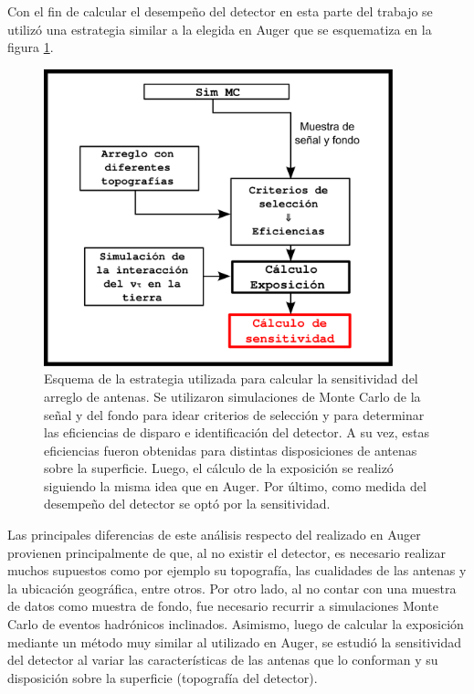 Con el fin de calcular el desempe\~no del detector en esta parte del trabajo se utiliz\'o una estrategia similar a la elegida en Auger que se esquematiza en la figura \ref{fig:analysisSchemaRadio}.
%
\begin{figure}[h!]
	\begin{center}
		\includegraphics[width=0.9\textwidth]{fig/motivacionRadio/analysisSchemaRadio}
		\caption{Esquema de la estrategia utilizada para calcular la sensitividad del arreglo de antenas. Se utilizaron simulaciones de Monte Carlo de la se\~nal y del fondo para idear criterios de selecci\'on y para determinar las eficiencias de disparo e identificaci\'on del detector. A su vez, estas eficiencias fueron obtenidas para distintas disposiciones de antenas sobre la superficie. Luego, el c\'alculo de la exposici\'on se realiz\'o siguiendo la misma idea que en Auger. Por \'ultimo, como medida del desempe\~no del detector se opt\'o por la sensitividad.}
		\label{fig:analysisSchemaRadio}
	\end{center}
\end{figure}
%
Las principales diferencias de este an\'alisis respecto del realizado en Auger provienen principalmente de que, al no existir el detector, es necesario realizar muchos supuestos como por ejemplo su topograf\'ia, las cualidades de las antenas y la ubicaci\'on geogr\'afica, entre otros.
Por otro lado, al no contar con una muestra de datos como muestra de fondo, fue necesario recurrir a simulaciones Monte Carlo de eventos hadr\'onicos inclinados.
Asimismo, luego de calcular la exposici\'on mediante un m\'etodo muy similar al utilizado en Auger, se estudi\'o la sensitividad del detector al variar las caracter\'isticas de las antenas que lo conforman y su disposici\'on sobre la superficie (topograf\'ia del detector).

